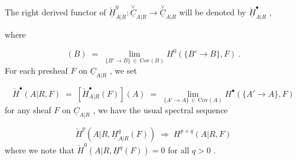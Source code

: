 \begin{center}
\end{center}
The right derived functor of  $\check{\underline{H}}^{0}_{A|R} : \overset{\vee}{\underline{C}}_{A|R} \to \overset{\vee}{\underline{C}}_{A|R}$  will be denoted by  $\check{\underline{H}}^{\bullet}_{A|R}$ ,

where

\begin{equation*}
[\check{\underline{H}}^{0}_{A|R}(F)](B) \;=\; \lim_{\{B' \to B\}\, \in\, \mathrm{Cov}(B)} H^{0}(\{B' \to B\},F) \ .
\end{equation*}
For each presheaf  $F$  on  $\underline{C}_{A|R}$  , we set

\begin{equation*}
\check{H}^{\bullet}(A|R,F) \;=\; [\check{H}^{\bullet}_{A|R}(F)](A) \;=\; \lim_{\{A' \to A\}\, \in\, \mathrm{Cov}(A)} H^{\bullet}(\{A' \to A\},F)
\end{equation*}
for any sheaf  $F$  on  $\underline{C}_{A|R}$  , we have the usual spectral sequence

\begin{equation*}
\check{H}^{p}(A|R,\underline{H}^{q}_{A|R}(F)) \;\Rightarrow\; H^{p+q}(A|R,F)
\end{equation*}
where we note that  $\check{H}^{0}(A|R,\underline{H}^{q}(F)) = 0$  for all  $q > 0$ .

